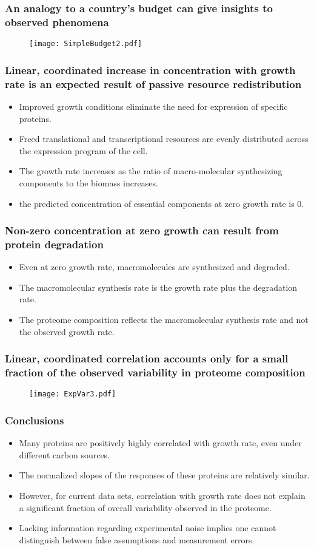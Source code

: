 \documentclass{beamer}
\begin{document}
\begin{frame}
\frametitle{An analogy to a country's budget can give insights to observed phenomena}
\begin{figure}[h!]
\centering
\texttt{[image: SimpleBudget2.pdf]}
\end{figure}
\end{frame}

\begin{frame}
\frametitle{Linear, coordinated increase in concentration with growth rate is an expected result of passive resource redistribution}
\begin{itemize}
\item Improved growth conditions eliminate the need for expression of specific proteins.
\item Freed translational and transcriptional resources are evenly distributed across the expression program of the cell.
\item The growth rate increases as the ratio of macro-molecular synthesizing components to the biomass increases.
\item the predicted concentration of essential components at zero growth rate is 0.
\end{itemize}
\end{frame}

\begin{frame}
\frametitle{Non-zero concentration at zero growth can result from protein degradation}
\begin{itemize}
\item Even at zero growth rate, macromolecules are synthesized and degraded.
\item The macromolecular synthesis rate is the growth rate plus the degradation rate.
\item The proteome composition reflects the macromolecular synthesis rate and not the observed growth rate.
\end{itemize}
\end{frame}

\begin{frame}
\frametitle{Linear, coordinated correlation accounts only for a small fraction of the observed variability in proteome composition}
\begin{figure}[h!]
\centering
\texttt{[image: ExpVar3.pdf]}
\end{figure}
\end{frame}
\begin{frame}
\frametitle{Conclusions}
\begin{itemize}
\item Many proteins are positively highly correlated with growth rate, even under different carbon sources.
\item The normalized slopes of the responses of these proteins are relatively similar.
\item However, for current data sets, correlation with growth rate does not explain a significant fraction of overall variability observed in the proteome.
\item Lacking information regarding experimental noise implies one cannot distinguish between false assumptions and measurement errors.
\end{itemize}
\end{frame}
\end{document}
